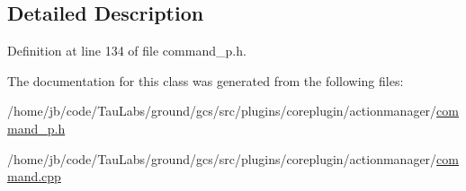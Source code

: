 \subsection{\-Detailed \-Description}


\-Definition at line 134 of file command\-\_\-p.\-h.



\-The documentation for this class was generated from the following files\-:\begin{DoxyCompactItemize}
\item 
/home/jb/code/\-Tau\-Labs/ground/gcs/src/plugins/coreplugin/actionmanager/\hyperlink{command__p_8h}{command\-\_\-p.\-h}\item 
/home/jb/code/\-Tau\-Labs/ground/gcs/src/plugins/coreplugin/actionmanager/\hyperlink{command_8cpp}{command.\-cpp}\end{DoxyCompactItemize}
